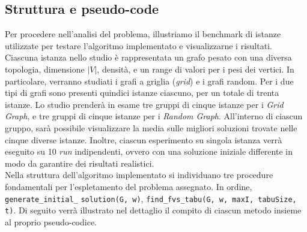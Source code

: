 \documentclass[a4paper, 10pt]{article}
\begin{document}
\subsection{Struttura e pseudo-code}
Per procedere nell'analisi del problema, illustriamo il benchmark di istanze utilizzate per testare l'algoritmo implementato e visualizzarne i risultati. Ciascuna istanza nello studio è rappresentata un grafo pesato con una diversa topologia, dimensione $|V|$, densità, e un range di valori per i pesi dei vertici. In particolare, verranno studiati i grafi a griglia (\textit{grid}) e i grafi random. Per i due tipi di grafi sono presenti quindici istanze ciascuno, per un totale di trenta istanze. Lo studio prenderà in esame tre gruppi di cinque istanze per i \textit{Grid Graph}, e tre gruppi di cinque istanze per i \textit{Random Graph}. All'interno di ciascun gruppo, sarà possibile visualizzare la media sulle migliori soluzioni trovate nelle cinque diverse istanze. Inoltre, ciascun esperimento su singola istanza verrà eseguito su 10 \textit{run} indipendenti, ovvero con una soluzione iniziale differente in modo da garantire dei risultati realistici. \\
Nella struttura dell'algoritmo implementato si individuano tre procedure fondamentali per l'espletamento del problema assegnato. In ordine, \verb|generate_initial_|
\verb|solution(G, w)|, \verb|find_fvs_tabu(G, w, maxI, tabuSize, t)|. Di seguito ver\-rà illustrato nel dettaglio il compito di ciascun metodo insieme al proprio pseudo-codice. 
\newline
\end{document}

